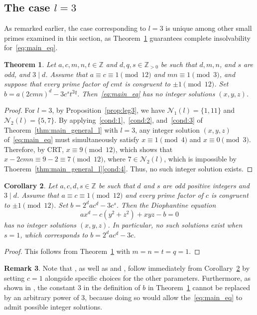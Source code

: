 \documentclass[11pt,a4paper]{amsart}
\newcommand{\ZZ}{\mathbb{Z}}
\theoremstyle{plain}
\newtheorem{theorem}{Theorem}[section]
\newtheorem{corollary}[theorem]{Corollary}
\theoremstyle{definition}
\newtheorem{remark}[theorem]{Remark}
\begin{document}
\subsection{The case \texorpdfstring{$l = 3$}{l = 3}}
\label{sec:general-3c}
As remarked earlier, the case corresponding to $l = 3$ is unique among other small primes examined in this section, as Theorem~\ref{thm:main3_gen} guarantees complete insolvability for~\eqref{eq:main_eq}. 


\begin{theorem}\label{thm:main3_gen}
Let $a, c, m, n, t \in \ZZ$ and $d, q, s \in \ZZ_{>0}$ be such that $d, m, n$, and $s$ are odd, and $3 \mid d$. Assume that $a \equiv c \equiv 1 \pmod{12}$ and $mn \equiv 1 \pmod{3}$, and suppose that every prime factor of $cmt$ is congruent to $\pm 1 \pmod{12}$. Set $b = a  (2c m n)^d - 3c^s t^{2q}$. Then~\eqref{eq:main_eq} has no integer solutions $(x,y,z) $.
\end{theorem}
\begin{proof}
     For $l=3$, by Proposition~\ref{prop:leg3}, we have $\mathcal{N}_1(l) = \{1, 11\} $ and $\mathcal{N}_2(l) = \{5, 7\} $. By applying~\ref{cond:1},~\ref{cond:2}, and~\ref{cond:3} of Theorem~\ref{thm:main_general_l} with $l=3$, any integer solution $(x,y,z)$ of~\eqref{eq:main_eq} must simultaneously satisfy $x\equiv1\pmod{4}$ and $x \equiv 0\pmod{3}$. Therefore, by CRT, $x \equiv 9\pmod{12}$, which shows that $x-2cmn\equiv9-2\equiv7\pmod{12}$, where $7\in \mathcal{N}_{2}(l)$, which is impossible by Thoerem~\ref{thm:main_general_l}\ref{cond:4}. Thus, no such integer solution exists.
\end{proof}

\begin{corollary}\label{cor:3cs}
Let $a, c,d,s \in \ZZ$ be such that $d$ and $s$ are odd positive integers and $3 \mid d$. Assume that $a \equiv c \equiv 1 \pmod{12}$ and every prime factor of $c$ is congruent to $\pm 1 \pmod{12}$. Set $b = 2^d a c^d - 3c^s$. Then the Diophantine equation
\begin{equation}
    ax^d - c(y^2 + z^2) + xyz - b = 0
\end{equation}
has no integer solutions $(x,y,z) $. In particular, no such solutions exist when $s = 1$, which corresponds to $b = 2^d a c^d - 3c$.
\end{corollary}

\begin{proof}
This follows from Theorem~\ref{thm:main3_gen} with $m=n=t=q=1$. 
\end{proof}
\begin{remark}
    Note that \cite[Theorem~2.1]{PrakashChakraborty}, as well as \cite[Theorem~1.3]{VaishyaSharma} and \cite[Theorem~1]{MajumdarSury}, follow immediately from Corollary~\ref{cor:3cs} by setting $c=1$ alongside specific choices for the other parameters. Furthermore, as shown in \cite[Example~2]{PrakashChakraborty}, the constant $3$ in the definition of $b$ in Theorem~\ref{thm:main3_gen} cannot be replaced by an arbitrary power of $3$, because doing so would allow the~\eqref{eq:main_eq} to admit possible integer solutions.
\end{remark}
\end{document}
